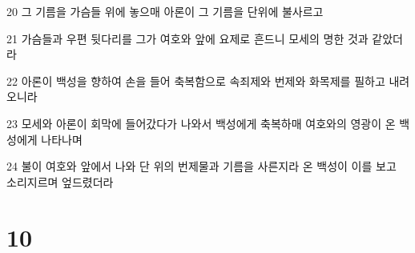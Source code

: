 \par 20 그 기름을 가슴들 위에 놓으매 아론이 그 기름을 단위에 불사르고
\par 21 가슴들과 우편 뒷다리를 그가 여호와 앞에 요제로 흔드니 모세의 명한 것과 같았더라
\par 22 아론이 백성을 향하여 손을 들어 축복함으로 속죄제와 번제와 화목제를 필하고 내려오니라
\par 23 모세와 아론이 회막에 들어갔다가 나와서 백성에게 축복하매 여호와의 영광이 온 백성에게 나타나며
\par 24 불이 여호와 앞에서 나와 단 위의 번제물과 기름을 사른지라 온 백성이 이를 보고 소리지르며 엎드렸더라

\chapter{10}

